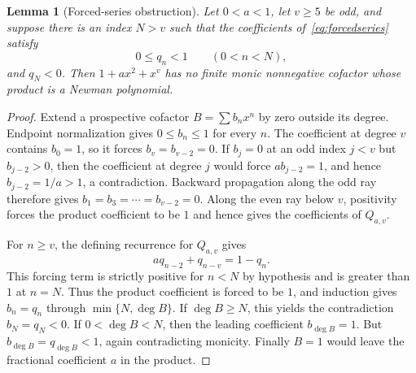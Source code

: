 \documentclass[11pt]{article}
\newtheorem{lemma}[theorem]{Lemma}
\theoremstyle{remark}
\numberwithin{equation}{section}
\begin{document}
\begin{lemma}[Forced-series obstruction]\label{lem:forcedseries}
Let $0<a<1$, let $v\ge5$ be odd, and suppose there is an index $N>v$ such
that the coefficients of~\eqref{eq:forcedseries} satisfy
\[
 0\le q_n<1\qquad(0<n<N),
\]
and $q_N<0$.  Then $1+a x^2+x^v$ has no finite monic nonnegative cofactor
whose product is a Newman polynomial.
\end{lemma}
\begin{proof}
Extend a prospective cofactor $B=\sum b_nx^n$ by zero outside its degree.
Endpoint normalization gives $0\le b_n\le1$ for every $n$.
The coefficient at degree $v$ contains $b_0=1$, so it forces
$b_v=b_{v-2}=0$.  If $b_j=0$ at an odd index $j<v$ but
$b_{j-2}>0$, then the coefficient at degree $j$ would force
$ab_{j-2}=1$, and hence $b_{j-2}=1/a>1$, a contradiction.  Backward
propagation along the odd ray therefore gives
$b_1=b_3=\cdots=b_{v-2}=0$.  Along the even ray below $v$, positivity forces
the product coefficient to be $1$ and hence gives the coefficients of
$Q_{a,v}$.

For $n\ge v$, the defining recurrence for $Q_{a,v}$ gives
\[
 a q_{n-2}+q_{n-v}=1-q_n.
\]
This forcing term is strictly positive for $n<N$ by hypothesis and is greater
than $1$ at $n=N$.  Thus the product coefficient is forced to be $1$, and
induction gives $b_n=q_n$ through
$\min\{N,\deg B\}$.  If $\deg B\ge N$, this yields the contradiction
$b_N=q_N<0$.  If $0<\deg B<N$, then the leading coefficient $b_{\deg B}=1$.
But $b_{\deg B}=q_{\deg B}<1$, again contradicting monicity.  Finally $B=1$
would leave the fractional coefficient $a$ in the product.
\end{proof}
\end{document}
